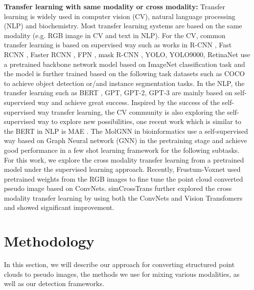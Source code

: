 \documentclass[]{modified_llncs}
\begin{document}
\textbf{Transfer learning with same modality or cross modality:} Transfer learning is widely used in computer vision (CV), natural language processing (NLP) and biochemistry. Most transfer learning systems are based on the same modality (e.g. RGB image in CV and text in NLP). For the CV, common transfer learning is based on supervised way such as works in R-CNN \cite{DBLP:journals/corr/GirshickDDM13}, Fast RCNN \cite{DBLP:conf/iccv/Girshick15}, Faster RCNN \cite{DBLP:conf/nips/RenHGS15}, FPN \cite{Lin_2017_CVPR}, mask R-CNN \cite{maskrcnn}, YOLO\cite{DBLP:journals/corr/RedmonDGF15}, YOLO9000\cite{DBLP:journals/corr/RedmonF16}, RetinaNet \cite{DBLP:journals/corr/abs-1708-02002} use a pretrained backbone network model based on ImageNet classification task and the model is further trained based on the following task datasets such as COCO to achieve object detection or/and instance segmentation tasks. In the NLP, the transfer learning such as BERT \cite{devlin-etal-2019-bert}, GPT\cite{gpt1}, GPT-2\cite{gpt2}, GPT-3\cite{gpt3} are mainly based on self-supervised way and achieve great success. Inspired by the success of the self-supervised way transfer learning, the CV community is also exploring the self-supervised way to explore new possibilities, one recent work which is similar to the BERT in NLP is MAE \cite{DBLP:journals/corr/abs-2111-06377}. The MolGNN \cite{molgnn1,liu2021covid} in bioinformatics use a self-supervised way based on Graph Neural network (GNN) in the pretraining stage and achieve good performance in a few shot learning framework for the following subtasks. For this work, we explore the cross modality transfer learning from a pretrained model under the supervised learning approach. Recently, Frustum-Voxnet \cite{Shen_2020_WACV} used pretrained weights from the RGB images to fine tune the point cloud converted pseudo image based on ConvNets\cite{10.1162/neco.1989.1.4.541}. simCrossTrans\cite{simCrossTrans_cite} further explored the cross modality transfer learning by using both the ConvNets\cite{10.1162/neco.1989.1.4.541} and Vision Transfomers\cite{dosovitskiy2021an,liu2021Swin} and showed significant improvement.\\
\section{Methodology}
In this section, we will describe our approach for converting structured point clouds to pseudo images, the methods we use for mixing various modalities, as well as our detection frameworks.
\end{document}
